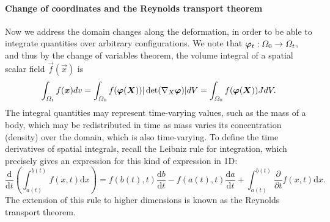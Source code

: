 \paragraph{Change of coordinates and the Reynolds transport theorem}
Now we address the domain changes along the deformation, in order to be able to integrate quantities over arbitrary configurations. We note that $\vvarphi_t:\Omega_0 \to \Omega_t$, and thus by the change of variables theorem, the volume integral of a spatial scalar field $\vec f(\vec x)$ is 
\begin{equation}
    \int_{\Omega_t}f(\vec x)dv = \int_{\Omega_0} f(\vvarphi(\vec X)) |\det(\vX\vvarphi)| dV = \int_{\Omega_0}f(\vvarphi(\vec X)) JdV.
\end{equation}
The integral quantities may represent time-varying values, such as the mass of a body, which may be redistributed in time as mass varies its concentration (density) over the domain, which is also time-varying. To define the time derivatives of spatial integrals, recall the Leibniz rule for integration, which precisely gives an expression for this kind of expression in 1D:
\begin{equation}
    \frac{\mathrm{d}}{\mathrm{d}t}\left(\int_{a(t)}^{b(t)}f(x,t) \mathrm{d}x\right) = f(b(t),t) \frac{\mathrm{d}b}{\mathrm{d}t} - f(a(t),t) \frac{\mathrm{d}a}{\mathrm{d}t} + \int_{a(t)}^{b(t)}\frac{\partial}{\partial t}f(x,t)\mathrm{d}x.
\end{equation}
The extension of this rule to higher dimensions is known as the Reynolds transport theorem. 
